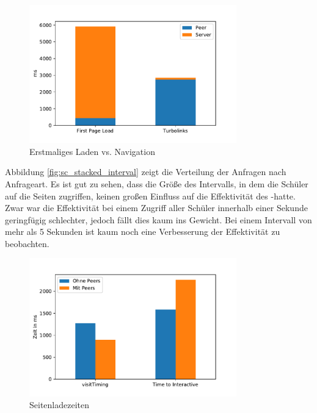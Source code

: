 \begin{figure}[!h]
	\centering
	\includegraphics[width=0.8\textwidth]{figures/sc_first_vs_later}
	\caption[A Figure Short-Title]{Erstmaliges Laden vs. Navigation}
	\label{fig:sc_first_vs_later}
\end{figure}
Abbildung \ref{fig:sc_stacked_interval} zeigt die Verteilung der Anfragen nach Anfrageart. Es ist gut zu sehen, dass die Größe des Intervalls, in dem die Schüler auf die Seiten zugriffen, keinen großen Einfluss auf die Effektivität des \pTp-\cdn hatte. Zwar war die Effektivität bei einem Zugriff aller Schüler innerhalb einer Sekunde geringfügig schlechter, jedoch fällt dies kaum ins Gewicht. Bei einem Intervall von mehr als 5 Sekunden ist kaum noch eine Verbesserung der Effektivität zu beobachten.
\begin{figure}[!h]
	\centering
	\includegraphics[width=0.8\textwidth]{figures/page_load_sc}
	\caption[A Figure Short-Title]{Seitenladezeiten}
	\label{fig:page_load_sc}
\end{figure}

